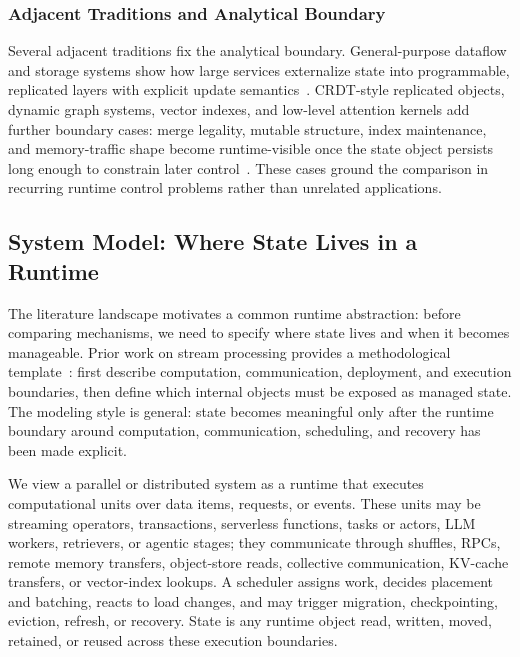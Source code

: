 ﻿\documentclass[manuscript]{acmart}
\begin{document}
\subsubsection{Adjacent Traditions and Analytical Boundary}

Several adjacent traditions fix the analytical boundary. General-purpose dataflow and storage systems show how large services externalize state into programmable, replicated layers with explicit update semantics~\cite{isard2007dryad,chambers2010flumejava,murray2011ciel,chang2008bigtable,decandia2007dynamo,lakshman2010cassandra,baker2011megastore,peng2010percolator}. CRDT-style replicated objects, dynamic graph systems, vector indexes, and low-level attention kernels add further boundary cases: merge legality, mutable structure, index maintenance, and memory-traffic shape become runtime-visible once the state object persists long enough to constrain later control~\cite{shapiro2011crdt,gao2026grace,karpukhin2020dpr,khattab2020colbert,jegou2011pq,malkov2020hnsw,dao2024flashattention2}. These cases ground the comparison in recurring runtime control problems rather than unrelated applications.


\subsection{System Model: Where State Lives in a Runtime}

The literature landscape motivates a common runtime abstraction: before comparing mechanisms, we need to specify where state lives and when it becomes manageable. Prior work on stream processing provides a methodological template~\cite{fernandez2010seep,fernandez2013osm,mao2025spacker,carbone2015flink}: first describe computation, communication, deployment, and execution boundaries, then define which internal objects must be exposed as managed state. The modeling style is general: state becomes meaningful only after the runtime boundary around computation, communication, scheduling, and recovery has been made explicit.

We view a parallel or distributed system as a runtime that executes computational units over data items, requests, or events. These units may be streaming operators, transactions, serverless functions, tasks or actors, LLM workers, retrievers, or agentic stages; they communicate through shuffles, RPCs, remote memory transfers, object-store reads, collective communication, KV-cache transfers, or vector-index lookups. A scheduler assigns work, decides placement and batching, reacts to load changes, and may trigger migration, checkpointing, eviction, refresh, or recovery. State is any runtime object read, written, moved, retained, or reused across these execution boundaries.
\end{document}
